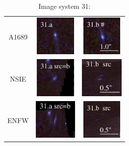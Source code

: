 \documentclass[useAMS,usenatbib]{mn2e}
\begin{document}
\begin{table}
  \caption{Image system 31:}\vspace{0mm}
  \begin{tabular}{ccc}
    \multicolumn{1}{m{1cm}}{{\Large A1689}}
    & \multicolumn{1}{m{1.7cm}}{\includegraphics[height=2.00cm,clip]{figs/nsie_img/rgb.img_31_a.ps}}
    & \multicolumn{1}{m{1.7cm}}{\includegraphics[height=2.00cm,clip]{figs/nsie_img/rgb.img_31_b.ps}} \\
    \multicolumn{1}{m{1cm}}{{\Large NSIE}}
    & \multicolumn{1}{m{1.7cm}}{\includegraphics[height=2.00cm,clip]{figs/nsie_img/rgb.pre_31_a_b_tri.ps}}
    & \multicolumn{1}{m{1.7cm}}{\includegraphics[height=2.00cm,clip]{figs/nsie_img/rgb.src_31_b.ps}} \\
    \multicolumn{1}{m{1cm}}{{\Large ENFW}}
    & \multicolumn{1}{m{1.7cm}}{\includegraphics[height=2.00cm,clip]{figs/enfw_img/rgb.pre_31_a_b_tri.ps}}
    & \multicolumn{1}{m{1.7cm}}{\includegraphics[height=2.00cm,clip]{figs/enfw_img/rgb.src_31_b.ps}} \\
  \end{tabular}

\end{table}

\clearpage

\bsp

\label{lastpage}
\end{document}
